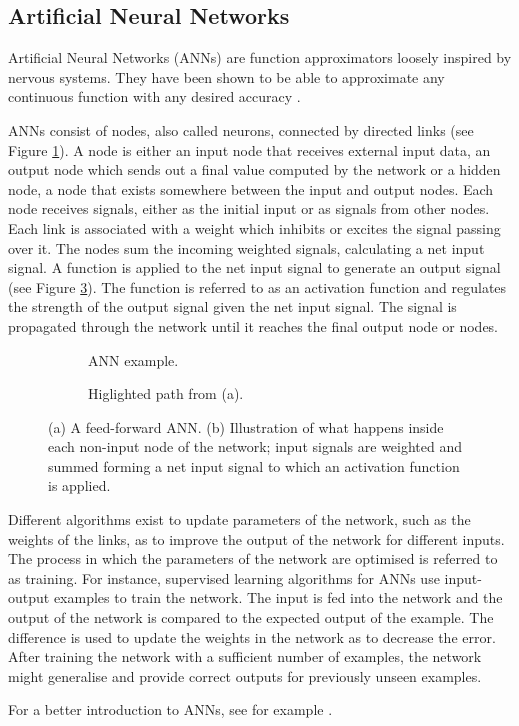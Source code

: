 \newpage
\subsection{Artificial Neural Networks}
Artificial Neural Networks (ANNs) are function approximators loosely inspired by nervous systems. They have been shown to be able
to approximate any continuous function with any desired accuracy \cite{universality_formal,universality_informal}.

ANNs consist of nodes, also called neurons, connected by directed links (see Figure \ref{feedforward}).
A node is either an input node that receives external input data, an output node which sends out a final value computed
by the network or a hidden node, a node that exists somewhere between the input and output nodes. Each node receives signals, either
as the initial input or as signals from other nodes. Each link is associated with a weight which inhibits or excites the signal
passing over it. The nodes sum the incoming weighted signals, calculating a net input signal. A function is applied to the net input
signal to generate an output signal (see Figure \ref{neuron}). The function is referred to as an activation function and regulates the strength of the output
signal given the net input signal. The signal is propagated through the network until it reaches the final output node or nodes.


\begin{figure}[htb]
    \begin{mdframed}
        \begin{subfigure}[b]{0.5\textwidth}
            \centering
            \resizebox{0.7\textwidth}{!}{}
            \caption{ANN example.}
            \label{feedforward}
        \end{subfigure}
        \begin{subfigure}[b]{0.5\textwidth}
            \centering
            \resizebox{0.9\textwidth}{!}{}
            \caption{Higlighted path from (a).}
            \label{neuron}
        \end{subfigure}
    \end{mdframed}
    \caption{(a) A feed-forward ANN. (b) Illustration of what happens inside each non-input node of the network; input
                 signals are weighted and summed forming a net input signal to which an activation function is applied.}
\end{figure}

Different algorithms exist to update parameters of the network, such as the weights of the
links, as to improve the output of the network for different inputs. The process in which the parameters of
the network are optimised is referred to as training. For instance, supervised learning algorithms for ANNs use input-output
examples to train the network. The input is fed into the network and the output of the network is compared
to the expected output of the example. The difference is used to update the weights in the network as to decrease
the error. After training the network with a sufficient number of examples, the network might generalise and provide
correct outputs for previously unseen examples.

For a better introduction to ANNs, see for example \cite{compint}.